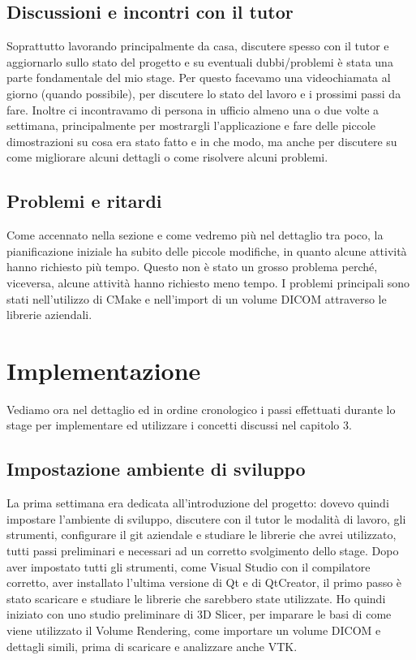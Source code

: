 \subsection{Discussioni e incontri con il tutor}
Soprattutto lavorando principalmente da casa, discutere spesso con il tutor e aggiornarlo sullo stato del progetto e su eventuali dubbi/problemi è stata una parte fondamentale del mio stage. Per questo facevamo una videochiamata al giorno (quando possibile), per discutere lo stato del lavoro e i prossimi passi da fare. Inoltre ci incontravamo di persona in ufficio almeno una o due volte a settimana, principalmente per mostrargli l'applicazione e fare delle piccole dimostrazioni su cosa era stato fatto e in che modo, ma anche per discutere su come migliorare alcuni dettagli o come risolvere alcuni problemi.

\subsection{Problemi e ritardi}
Come accennato nella sezione  e come vedremo più nel dettaglio tra poco, la pianificazione iniziale ha subito delle piccole modifiche, in quanto alcune attività hanno richiesto più tempo. Questo non è stato un grosso problema perché, viceversa, alcune attività hanno richiesto meno tempo. I problemi principali sono stati nell'utilizzo di CMake e nell'import di un volume DICOM attraverso le librerie aziendali.

\section{Implementazione}
Vediamo ora nel dettaglio ed in ordine cronologico i passi effettuati durante lo stage per implementare ed utilizzare i concetti discussi nel capitolo 3.

\subsection{Impostazione ambiente di sviluppo}
La prima settimana era dedicata all'introduzione del progetto: dovevo quindi impostare l'ambiente di sviluppo, discutere con il tutor le modalità di lavoro, gli strumenti, configurare il git aziendale e studiare le librerie che avrei utilizzato, tutti passi preliminari e necessari ad un corretto svolgimento dello stage.
Dopo aver impostato tutti gli strumenti, come Visual Studio con il compilatore corretto, aver installato l'ultima versione di Qt e di QtCreator, il primo passo è stato scaricare e studiare le librerie che sarebbero state utilizzate. Ho quindi iniziato con uno studio preliminare di 3D Slicer, per imparare le basi di come viene utilizzato il Volume Rendering, come importare un volume DICOM e dettagli simili, prima di scaricare e analizzare anche VTK. 

